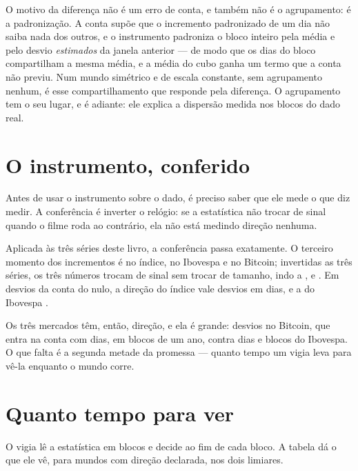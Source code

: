 O motivo da diferença não é um erro de conta, e também não é o agrupamento: é a padronização. A conta
supõe que o incremento padronizado de um dia não saiba nada dos outros, e o instrumento padroniza o
bloco inteiro pela média e pelo desvio \emph{estimados} da janela anterior --- de modo que os
\numDirecaoJanela{} dias do bloco compartilham a mesma média, e a média do cubo ganha um termo que a
conta não previu. Num mundo simétrico e de escala constante, sem agrupamento nenhum, é esse
compartilhamento que responde pela diferença. O agrupamento tem o seu lugar, e é adiante: ele explica
a dispersão medida nos blocos do dado real.

\section{O instrumento, conferido}

Antes de usar o instrumento sobre o dado, é preciso saber que ele mede o que diz medir. A conferência
é inverter o relógio: se a estatística não trocar de sinal quando o filme roda ao contrário, ela não
está medindo direção nenhuma.

Aplicada às três séries deste livro, a conferência passa exatamente. O terceiro momento dos
incrementos é \numDirecaoIndiceMomento{} no índice, \numDirecaoIbovespaMomento{} no Ibovespa e
\numDirecaoBitcoinMomento{} no Bitcoin; invertidas as três séries, os três números trocam de sinal
sem trocar de tamanho, indo a \numDirecaoIndiceInvertida{}, \numDirecaoIbovespaInvertida{} e
\numDirecaoBitcoinInvertida. Em desvios da conta do nulo, a direção do índice vale
\numDirecaoIndiceRazao{} desvios em \numDirecaoIndiceDias{} dias, e a do Ibovespa
\numDirecaoIbovespaRazao{}.

Os três mercados têm, então, direção, e ela é grande: \numDirecaoBitcoinRazao{} desvios no Bitcoin, que
entra na conta com \numDirecaoBitcoinDias{} dias, em \numDirecaoBitcoinBlocos{} blocos de um ano, contra
\numDirecaoIbovespaDias{} dias e \numDirecaoIbovespaBlocos{} blocos do Ibovespa.
O que falta é a segunda metade da promessa --- quanto tempo um vigia leva para vê-la enquanto o mundo
corre.

\section{Quanto tempo para ver}

O vigia lê a estatística em blocos e decide ao fim de cada bloco. A tabela dá o que ele vê, para
mundos com direção declarada, nos dois limiares.

